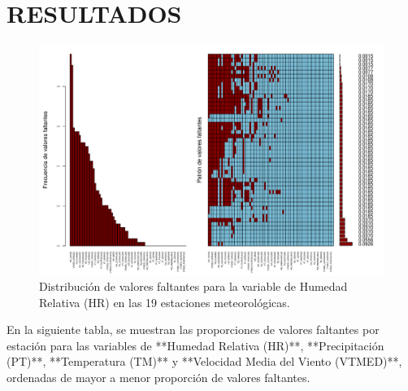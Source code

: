 \chapter{RESULTADOS}


\begin{figure}[H]
    \centering
    \caption{Distribución de valores faltantes para la variable de Humedad Relativa (HR) en las 19 estaciones meteorológicas.}\includegraphics[width=\textwidth]{Capitulos/datos_faltanes/grafico_general.pdf} 
    
    \label{fig:valores_faltantes}
\end{figure}


En la siguiente tabla, se muestran las proporciones de valores faltantes por estación para las variables de **Humedad Relativa (HR)**, **Precipitación (PT)**, **Temperatura (TM)** y **Velocidad Media del Viento (VTMED)**, ordenadas de mayor a menor proporción de valores faltantes.

